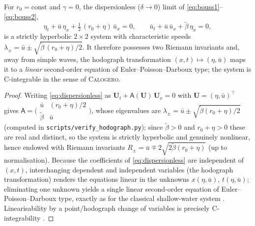 \documentclass[alpha-refs, 12pt]{wiley-article}
\begin{document}
\begin{lemma}\label{lem:hodograph}
For $r_{0}=\mathrm{const}$ and $\gamma=0$, the dispersionless ($\delta\to0$) limit of \eqref{eq:bouss1}--\eqref{eq:bouss2},
\begin{equation}\label{eq:dispersionless}
  \eta_{t}+\bar{u}\,\eta_{x}+\tfrac12\,(r_{0}+\eta)\,\bar{u}_{x}=0,\qquad
  \bar{u}_{t}+\bar{u}\,\bar{u}_{x}+\tilde{\beta}\,\eta_{x}=0,
\end{equation}
is a strictly hyperbolic $2\times2$ system with characteristic speeds
$\lambda_{\pm}=\bar{u}\pm\sqrt{\tilde{\beta}\,(r_{0}+\eta)/2}$. It therefore possesses two Riemann invariants and, away from simple waves, the hodograph transformation $(x,t)\mapsto(\eta,\bar{u})$ maps it to a \emph{linear} second-order equation of Euler--Poisson--Darboux type; the system is C-integrable in the sense of \textsc{Calogero}.
\end{lemma}
\begin{proof}
Writing \eqref{eq:dispersionless} as $\mathbf{U}_{t}+\mathsf{A}(\mathbf{U})\,\mathbf{U}_{x}=0$ with $\mathbf{U}=(\eta,\bar{u})^{\top}$ gives $\mathsf{A}=\bigl(\begin{smallmatrix}\bar{u}&(r_{0}+\eta)/2\\ \tilde{\beta}&\bar{u}\end{smallmatrix}\bigr)$, whose eigenvalues are $\lambda_{\pm}=\bar{u}\pm\sqrt{\tilde{\beta}(r_{0}+\eta)/2}$ (computed in \texttt{scripts/verify\_hodograph.py}); since $\tilde{\beta}>0$ and $r_{0}+\eta>0$ these are real and distinct, so the system is strictly hyperbolic and genuinely nonlinear, hence endowed with Riemann invariants $R_{\pm}=\bar{u}\mp 2\sqrt{2\tilde{\beta}(r_{0}+\eta)}$ (up to normalisation). Because the coefficients of \eqref{eq:dispersionless} are independent of $(x,t)$, interchanging dependent and independent variables (the hodograph transformation) renders the equations linear in the unknowns $x(\eta,\bar{u})$, $t(\eta,\bar{u})$; eliminating one unknown yields a single linear second-order equation of Euler--Poisson--Darboux type, exactly as for the classical shallow-water system \citep{Whitham1999}. Linearisability by a point/hodograph change of variables is precisely C-integrability \citep{Calogero1991}.
\end{proof}
\end{document}
